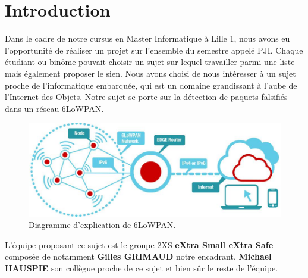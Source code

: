 \chapter*{Introduction}
\label{chap:introduction}

Dans le cadre de notre cursus en Master Informatique à Lille 1, nous avons eu l’opportunité de réaliser un projet sur l’ensemble du semestre appelé PJI. Chaque étudiant ou binôme pouvait choisir un sujet sur lequel travailler parmi une liste mais également proposer le sien.
Nous avons choisi de nous intéresser à un sujet proche de l'informatique embarquée, qui est un domaine grandissant à l'aube de l'Internet des Objets. Notre sujet se porte sur la détection de paquets falsifiés dans un réseau 6LoWPAN.

\begin{figure}[htp]
	\centering
	\includegraphics[width=16cm]{images/6lowpan.jpg}
	\caption{Diagramme d'explication de 6LoWPAN.}
	\label{fig:diagramme-6lowpan}
\end{figure}
L'équipe proposant ce sujet est le groupe 2XS \textbf{eXtra Small eXtra Safe} composée de notamment \textbf{Gilles GRIMAUD} notre encadrant, \textbf{Michael HAUSPIE} son collègue proche de ce sujet et bien sûr le reste de l'équipe.

